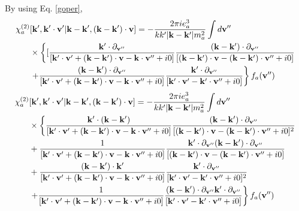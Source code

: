 \documentclass[12pt,a4paper,ruledheader]{report}
\begin{document}
\begin{appendix}
By using Eq. \eqref{goper},
\begin{equation}
\begin{split}
\chi_a^{(2)}&[{\bf k'},{\bf k'\cdot v'}|{\bf k-k'},({\bf k-k'})\cdot{\bf v}]
=-\frac{2\pi ie_a^3}{k k'|{\bf k-k'}|m_a^2}\int d{\bf v''}\\
&\times\left\{[\frac{{\bf k'}\cdot \partial_{\bf v''}}
{[{\bf k'\cdot v'}+({\bf k-k'})\cdot{\bf v}-{\bf k}\cdot{\bf v''}+i0]}
\frac{({\bf k-k'})\cdot \partial_{\bf v''}}
{[({\bf k-k'})\cdot {\bf v}
-({\bf k-k'})\cdot{\bf v''}+i0]} \right.\\
&\left. + \frac{({\bf k-k'})\cdot \partial_{\bf v''}}
{[{\bf k'}\cdot {\bf v'}+({\bf k-k'})\cdot {\bf v}
-{\bf k}\cdot{\bf v''}+i0]}
\frac{{\bf k'}\cdot \partial_{\bf v''}}
{[{\bf k'\cdot v'}-{\bf k'}\cdot{\bf v''}+i0]}
\right\} f_a({\bf v''})
\end{split}
\end{equation}
\begin{equation}
\begin{split}
\chi_a^{(2)}&[{\bf k'},{\bf k'\cdot v'}|{\bf k-k'},({\bf k-k'})\cdot{\bf v}]
=-\frac{2\pi ie_a^3}{k k'|{\bf k-k'}|m_a^2}\int d{\bf v''}\\
&\times\left\{\frac{
{\bf k'}\cdot({\bf k-k'})}
{[{\bf k'\cdot v'}+({\bf k-k'})\cdot{\bf v}-{\bf k}\cdot{\bf v''}+i0]}
\frac{({\bf k-k'})\cdot \partial_{\bf v''}}
{[({\bf k-k'})\cdot {\bf v}
-({\bf k-k'})\cdot{\bf v''}+i0]^2} \right.\\
& + \frac{1}
{[{\bf k'\cdot v'}+({\bf k-k'})\cdot{\bf v}-{\bf k}\cdot{\bf v''}+i0]}
\frac{{\bf k'}\cdot \partial_{\bf v''}
({\bf k-k'})\cdot \partial_{\bf v''}}
{[({\bf k-k'})\cdot {\bf v}
-({\bf k-k'})\cdot{\bf v''}+i0]}\\
& + \frac{({\bf k-k'})\cdot {\bf k'}}
{[{\bf k'}\cdot {\bf v'}+({\bf k-k'})\cdot {\bf v}
-{\bf k}\cdot{\bf v''}+i0]}
\frac{{\bf k'}\cdot \partial_{\bf v''}}
{[{\bf k'\cdot v'}-{\bf k'}\cdot{\bf v''}+i0]^2}\\
&\left. + \frac{1}
{[{\bf k'}\cdot {\bf v'}+({\bf k-k'})\cdot {\bf v}
-{\bf k}\cdot{\bf v''}+i0]}
\frac{({\bf k-k'})\cdot \partial_{\bf v''}
{\bf k'}\cdot \partial_{\bf v''}}
{[{\bf k'\cdot v'}-{\bf k'}\cdot{\bf v''}+i0]}
\right\} f_a({\bf v''})
\end{split}
\end{equation}


\end{appendix}
\end{document}
